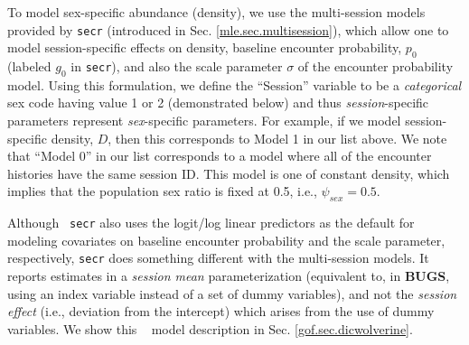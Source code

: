 To model sex-specific abundance (density), we  use the multi-session models  provided by
\mbox{\tt secr} (introduced in Sec. \ref{mle.sec.multisession}), which
allow one to model session-specific effects on density, baseline
encounter probability, $p_{0}$ (labeled $g_{0}$ in \mbox{\tt secr}), and also the scale
parameter $\sigma$ of the encounter probability model. Using this
formulation, we define the ``Session'' variable to be a {\it
  categorical} sex code having value 1 or 2 (demonstrated below) and
thus {\it session}-specific parameters represent {\it sex}-specific parameters.
For example, if we model session-specific density, $D$, then this
corresponds to Model 1 in our list above.  We note that ``Model 0'' in
our list corresponds to a model where all of the encounter
histories have the same session ID. This model is one of constant
density, which implies that the population sex ratio is fixed at 0.5, i.e.,
$\psi_{sex} = 0.5$. 

\begin{comment}

For fitting these models in {\bf BUGS} we use dummy variables. We
model  covariates on $p_{0}$ on
the logit-scale, and covariates on $\sigma$ on the
log-scale.
 Thus,  we will express  models allowing for sex-specificity
using a dummy variable \mbox{\tt Sex} and new parameters
($\alpha_{sex}$, $\beta_{sex}$) which
represent the {\it effect} of \mbox{\tt Sex} at level 1:
\[
 \mbox{logit}(p_{0,i}) = \alpha_{0} + \alpha_{sex} \mbox{\tt Sex}_{i}
\]
and
\[
 \mbox{log}(\sigma_{i}) = \log(\sigma_{0}) + \beta_{sex} \mbox{\tt Sex}_{i}
\]
In these expressions, the sex variable $\mbox{\tt Sex}_{i}$ is a
binary variable where $\mbox{\tt Sex}_{i}= 0$ corresponds to female,
and $\mbox{\tt Sex}_{i} = 1$ corresponds to male. 

\end{comment}

Although \mbox{\tt
  secr} also uses the logit/log linear predictors as the default for
modeling covariates on baseline encounter probability and the scale
parameter, respectively, \mbox{\tt secr} does something different with
the multi-session models. It reports estimates in a {\it session mean}
parameterization (equivalent to, in {\bf BUGS}, using an index
variable instead of a set of dummy variables), and not the {\it
  session effect} (i.e., deviation from the intercept) which arises
from the use of dummy variables.  We show this \bugs~ model description 
in Sec. \ref{gof.sec.dicwolverine}. 


